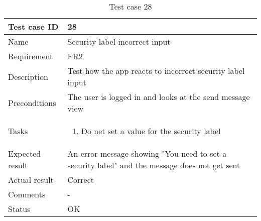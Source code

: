 				\begin{table}
			\begin{tabular}{l|p{10cm}}
				Test case ID & 28\\ \hline
				Name &Security label incorrect input\\ \hline
				Requirement & FR2\\ \hline
				Description&Test how the app reacts to incorrect security label input\\ \hline
				Preconditions&The user is logged in and looks at the send message view\\ \hline
				Tasks&\begin{enumerate}
						\item{}Do net set a value for the security label
					\end{enumerate} \\ \hline
				Expected result&An error message showing "You need to set a security label" and the message does not get sent\\ \hline
				Actual result& Correct\\ \hline
				Comments&- \\ \hline
				Status& OK\\ \hline 
			\end{tabular}
			\caption{Test case 28} \label{tab:case28}
			\end{table}